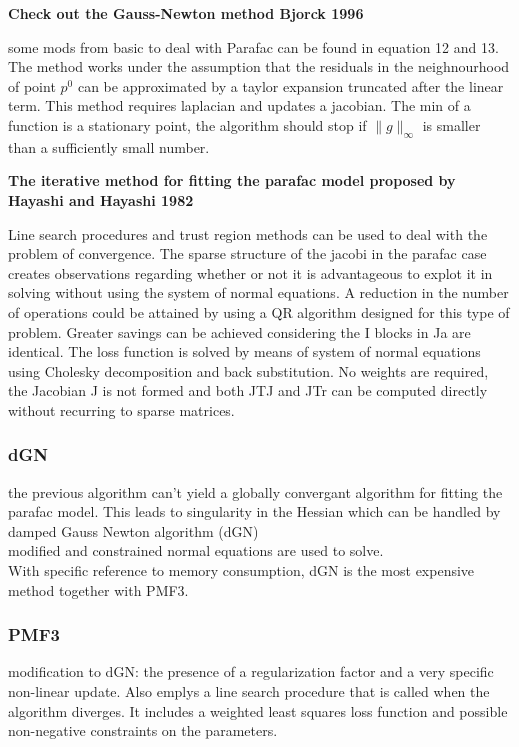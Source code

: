 \documentclass[10pt, draft]{article}
\begin{document}
 \textbf{Check out the Gauss-Newton method Bjorck 1996}\linebreak[1]
 
 some mods from basic to deal with Parafac can be found in equation 12 and 13.\\

The method works under the assumption that the residuals in the neighnourhood of point $p^0$ can be approximated by a taylor expansion truncated after the linear term.  This method requires laplacian and updates a jacobian.  The min of a function is a stationary point, the algorithm should stop if $\|g\|_\infty $ is smaller than a sufficiently small number.\linebreak[1]

\textbf{The iterative method for fitting the parafac model proposed by Hayashi and Hayashi 1982}

Line search procedures and trust region methods can be used to deal with the problem of convergence.  The sparse structure of the jacobi in the parafac case creates observations regarding whether or not it is advantageous to explot it in solving without using the system of normal equations.  A reduction in the number of operations could be attained by using a QR algorithm designed for this type of problem.  Greater savings can be achieved considering the I blocks in Ja are identical.  The loss function is solved by means of system of normal equations using Cholesky decomposition and back substitution.  No weights are required, the Jacobian J is not formed and both JTJ and JTr can be computed directly without recurring to sparse matrices.

\subsubsection{dGN}
the previous algorithm can't yield a globally convergant algorithm for fitting the parafac model.  This leads to singularity in the Hessian which can be handled by damped Gauss Newton algorithm (dGN)\\
modified and constrained normal equations are used to solve. \\
With specific reference to memory consumption, dGN is the most expensive method together with PMF3.  

\subsubsection{PMF3}
modification to dGN: the presence of a regularization factor and a very specific non-linear update. Also emplys a line search procedure that is called when the algorithm diverges. It includes a weighted least squares loss function and possible non-negative constraints on the parameters.
\end{document}
